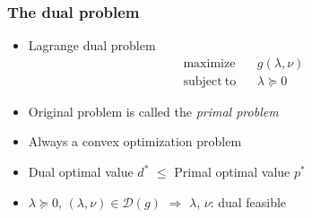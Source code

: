 \subsubsection*{The dual problem}
\begin{itemize}
    \item Lagrange dual problem
        $$ \begin{aligned}
            \mathrm{maximize}~~&~~g(\lambda,\nu) \\
            \mathrm{subject~to}~~&~~\lambda\succeq 0
        \end{aligned} $$
    \item Original problem is called the \textit{primal problem}
    \item Always a convex optimization problem
    \item Dual optimal value $d^\ast$ $\leq$ Primal optimal value $p^\ast$
    \item $\lambda\succeq 0$, $(\lambda,\nu)\in\mathcal{D}(g)$ $\Rightarrow$ $\lambda$, $\nu$: dual feasible
\end{itemize}


